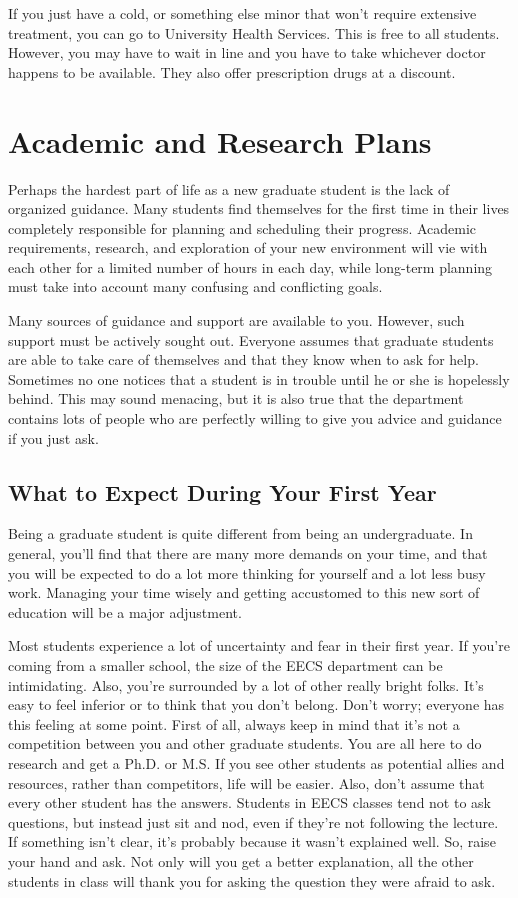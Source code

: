 \documentclass[11pt]{article}
\begin{document}
If you just have a cold, or something else minor that won't require
extensive treatment, you can go to University Health Services.  This
is free to all students.  However, you may have to wait in line and
you have to take whichever doctor happens to be available.  They also
offer prescription drugs at a discount.

\newpage
\section{Academic and Research Plans}
\label{sec-5}

Perhaps the hardest part of life as a new graduate student is the lack
of organized guidance.  Many students find themselves for the first
time in their lives completely responsible for planning and scheduling
their progress.  Academic requirements, research, and exploration of
your new environment will vie with each other for a limited number of
hours in each day, while long-term planning must take into account
many confusing and conflicting goals.

Many sources of guidance and support are available to you.  However,
such support must be actively sought out.  Everyone assumes that
graduate students are able to take care of themselves and that they
know when to ask for help.  Sometimes no one notices that a student is
in trouble until he or she is hopelessly behind.  This may sound
menacing, but it is also true that the department contains lots of
people who are perfectly willing to give you advice and guidance if
you just ask.
\subsection{What to Expect During Your First Year}
\label{sec-5_1}

Being a graduate student is quite different from being an
undergraduate.  In general, you’ll find that there are many more
demands on your time, and that you will be expected to do a lot more
thinking for yourself and a lot less busy work.  Managing your time
wisely and getting accustomed to this new sort of education will be a
major adjustment.

Most students experience a lot of uncertainty and fear in their first
year.  If you’re coming from a smaller school, the size of the EECS
department can be intimidating.  Also, you’re surrounded by a lot of
other really bright folks.  It’s easy to feel inferior or to think
that you don’t belong.  Don’t worry; everyone has this feeling at some
point.  First of all, always keep in mind that it’s not a competition
between you and other graduate students.  You are all here to do
research and get a Ph.D. or M.S.  If you see other students as
potential allies and resources, rather than competitors, life will be
easier.  Also, don’t assume that every other student has the answers.
Students in EECS classes tend not to ask questions, but instead just
sit and nod, even if they’re not following the lecture.  If something
isn’t clear, it’s probably because it wasn’t explained well.  So,
raise your hand and ask.  Not only will you get a better explanation,
all the other students in class will thank you for asking the question
they were afraid to ask.
\end{document}
